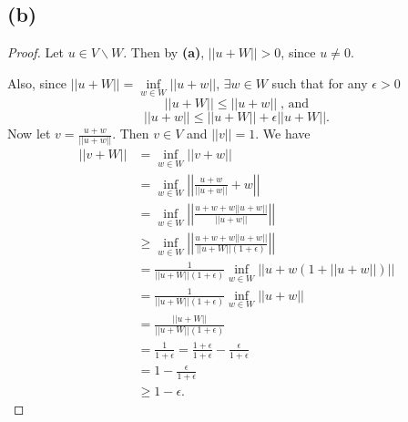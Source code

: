 \documentclass{article}
\begin{document}
\subsection*{(b)}
\begin{proof}
	Let $u \in V \backslash W$. Then by \textbf{(a)}, $||u+W|| > 0$, since $u \neq 0$.
	
	Also, since $||u+W|| = \inf\limits_{w\in W}||u + w||$, $\exists w\in W$ such that for any $\epsilon >0$
	\begin{equation}
		||u+W|| \leq ||u+w|| \; \textrm{, and}
	\end{equation}
	\begin{equation}
		||u+w|| \leq ||u+W|| + \epsilon||u+W||.
	\end{equation}
	Now let $v = \frac{u+w}{||u+w||}$. Then $v \in V$ and $||v||=1$. We have
	\begin{align}
		||v+W|| &= \inf\limits_{w\in W}||v+w|| \\
		&= \inf\limits_{w\in W}\left|\left|\frac{u+w}{||u+w||} + w\right|\right| \\
		&= \inf\limits_{w\in W}\left|\left|\frac{u+w + w||u+w||}{||u+w||}\right|\right| \\
		&\geq \inf\limits_{w\in W}\left|\left|\frac{u+w+w||u+w||}{||u+W||(1+\epsilon)}\right|\right| \\
		&= \frac{1}{||u+W||(1+\epsilon)}\inf\limits_{w\in W}\left|\left|u+w(1+||u+w||)\right|\right| \\
		&= \frac{1}{||u+W||(1+\epsilon)}\inf\limits_{w\in W}||u+w|| \\
		&= \frac{||u+W||}{||u+W||(1+\epsilon)} \\
		&= \frac{1}{1+\epsilon} = \frac{1+\epsilon}{1+\epsilon} - \frac{\epsilon}{1+\epsilon} \\
		&= 1-\frac{\epsilon}{1+\epsilon} \\
		&\geq 1 - \epsilon.
	\end{align}
\end{proof}
\end{document}
